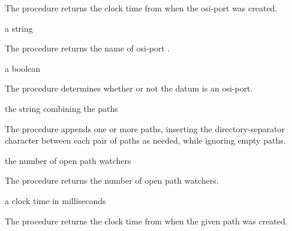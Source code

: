The  procedure returns the clock time from
 when the osi-port  was created.

\begin{procedure}
\end{procedure}
\returns{} a string

The  procedure returns the name of osi-port
.

\begin{procedure}
\end{procedure}
\returns{} a boolean

The  procedure determines whether or not the datum
 is an osi-port.

\begin{procedure}
\end{procedure}
\returns{} the string combining the paths

The  procedure appends one or more paths, inserting
the directory-separator character between each pair of paths as
needed, while ignoring empty paths.


\begin{procedure}
\end{procedure}
\returns{} the number of open path watchers

The  procedure returns the number of open
path watchers.

\begin{procedure}
\end{procedure}
\returns{} a clock time in milliseconds

The  procedure returns the clock time
from  when the given path  was created.

